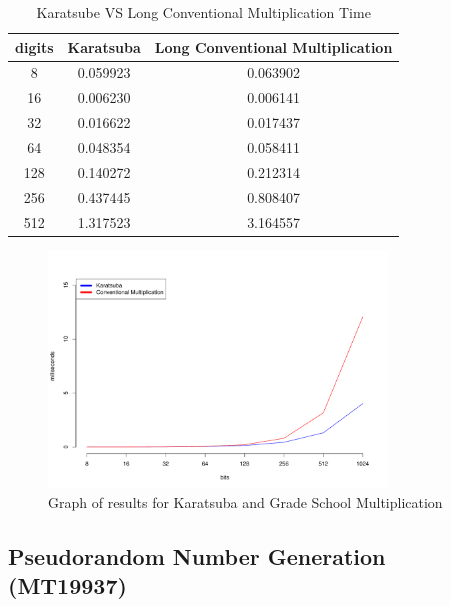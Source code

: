 \documentclass[12pt,journal,compsoc]{IEEEtran}
\begin{document}
\begin{table}[ht]
	\begin{center}
	\begin{tabular}{|c|c|c|}
    	\hline
       		digits 	&		Karatsuba					&	Long Conventional Multiplication\\
	\hline
    		8		&		0.059923					&	0.063902 \\
		16		&		0.006230					&	0.006141 \\
		32		&		0.016622					&	0.017437 \\
		64		&		0.048354					&	0.058411 \\
		128		&		0.140272					&	0.212314 \\
		256		&		0.437445					&	0.808407 \\
		512		&		1.317523					&	3.164557 \\
	\hline
	\end{tabular}
	\end{center}
	\caption{Karatsube VS Long Conventional Multiplication Time}
	\label{table:karatsubaVSgrade}

\end{table}

\begin{figure}[ht!]
\centering
\includegraphics[width=90mm]{images/karatsubaVSgradeSchool.pdf}
\caption{Graph of results for Karatsuba and Grade School Multiplication}
\label{fig:karatsubaVSgrade}
\end{figure}


\subsection{{Pseudorandom Number Generation (MT19937)}}
\label{sec:mersenne}
\end{document}
